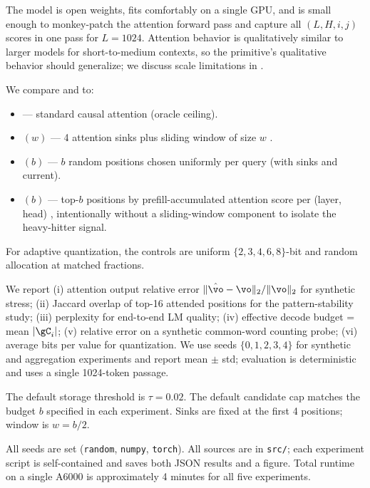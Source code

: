  The model is open weights, fits comfortably on a single GPU, and is small enough to monkey-patch the attention forward pass and capture all $(L, H, i, j)$ scores in one pass for $L = 1024$. Attention behavior is qualitatively similar to larger models for short-to-medium contexts, so the primitive's qualitative behavior should generalize; we discuss scale limitations in .

 We compare \hmaid and \hmang to:
\begin{itemize}[leftmargin=*,itemsep=0pt,topsep=0pt]
    \item \full --- standard causal attention (oracle ceiling).
    \item \streaming$(w)$ --- 4 attention sinks plus sliding window of size $w$ \citep{xiao2023streamingllm}.
    \item \randomb$(b)$ --- $b$ random positions chosen uniformly per query (with sinks and current).
    \item \hto$(b)$ --- top-$b$ positions by prefill-accumulated attention score per (layer, head) \citep{zhang2023h2o}, intentionally without a sliding-window component to isolate the heavy-hitter signal.
\end{itemize}
For adaptive quantization, the controls are uniform $\{2, 3, 4, 6, 8\}$-bit and random allocation at matched fractions.

 We report (i) attention output relative error $\|\hat{\vo} - \vo\|_2 / \|\vo\|_2$ for synthetic stress; (ii) Jaccard overlap of top-16 attended positions for the pattern-stability study; (iii) \wikitext perplexity for end-to-end LM quality; (iv) effective decode budget = mean $|\gC_i|$; (v) relative error on a synthetic common-word counting probe; (vi) average bits per \kvcache value for quantization. We use seeds $\{0, 1, 2, 3, 4\}$ for synthetic and aggregation experiments and report mean $\pm$ std; \wikitext evaluation is deterministic and uses a single 1024-token passage.

 The default storage threshold is $\tau = 0.02$. The default candidate cap matches the budget $b$ specified in each experiment. Sinks are fixed at the first 4 positions; window is $w = b/2$.

 All seeds are set (\texttt{random}, \texttt{numpy}, \texttt{torch}). All sources are in \texttt{src/}; each experiment script is self-contained and saves both JSON results and a figure. Total runtime on a single A6000 is approximately 4 minutes for all five experiments.
